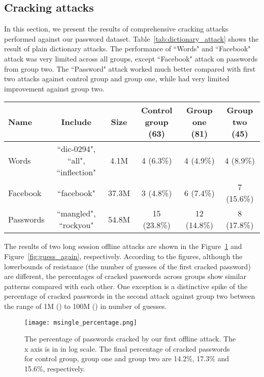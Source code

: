 \documentclass[conference]{IEEEtran}
\begin{document}
\subsection{Cracking attacks}



In this section, we present the results of comprehensive cracking attacks performed against our password dataset. Table~\ref{tab:dictionary_attack} shows the result of plain dictionary attacks. The performance of ``Words" and ``Facebook" attack was very limited across all groups, except ``Facebook" attack on passwords from group two. The ``Password" attack worked much better compared with first two attacks against control group and group one, while had very limited improvement against group two.

\begin{table*}[tbph]
\begin{center}
  \begin{tabular}{ l | c | c | c | c | c }
    \hline
    Name & Include & Size & Control group (63) & Group one (81) & Group two (45) \\ \hline
    Words & ``dic-0294", ``all", ``inflection" & 4.1M & 4 (6.3\%) & 4 (4.9\%) & 4 (8.9\%) \\
    Facebook & ``facebook" & 37.3M & 3 (4.8\%) & 6 (7.4\%) & 7 (15.6\%) \\
    Passwords & ``mangled", ``rockyou" & 54.8M & 15 (23.8\%) & 12 (14.8\%) & 8 (17.8\%) \\
    \hline
  \end{tabular}
  \caption{Results of plain dictionary attack with different dictionaries. ``Include" included all dictionaries we used in each attack. The size is the number of unique entries each combined dictionary has.}
    \label{tab:dictionary_attack}
\end{center}
\end{table*}

The results of two long session offline attacks are shown in the Figure~\ref{fig:msingle_percentage} and Figure~\ref{fig:guess_again}, respectively. According to the figures, although the lowerbounds of resistance (the number of guesses of the first cracked password) are different, the percentages of cracked passwords across groups show similar patterns compared with each other. One exception is a distinctive spike of the percentage of cracked passwords in the second attack against group two between the range of 1M () to 100M () in number of guesses.


\begin{figure}
\texttt{[image: msingle\_percentage.png]}
\caption{\label{fig:msingle_percentage} The percentage of passwords cracked by our first offline attack. The x axis is in in log scale.
The final percentage of cracked passwords for control group, group one and group two are 14.2\%, 17.3\% and 15.6\%, respectively.}
\vspace{-9pt}
\end{figure}
\end{document}

